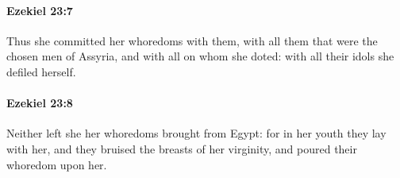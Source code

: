 		\paragraph{Ezekiel 23:7} %
			\label{EZEKIEL-23-7}

			Thus she committed her whoredoms with them, with all them that were the chosen men of Assyria, and with all on whom she doted: with all their idols she defiled herself.


		\paragraph{Ezekiel 23:8} %
			\label{EZEKIEL-23-8}

			Neither left she her whoredoms brought from Egypt: for in her youth they lay with her, and they bruised the breasts of her virginity, and poured their whoredom upon her.


